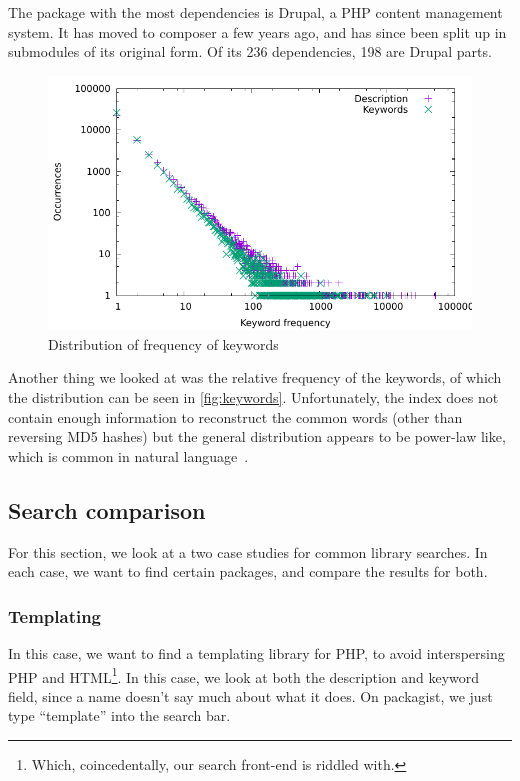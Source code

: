 \documentclass{article}
\begin{document}
The package with the most dependencies is Drupal, a PHP content management system. It has moved to composer a few years ago, and has since been split up in submodules of its original form. Of its 236 dependencies, 198 are Drupal parts.

\begin{figure}
	\centering
	\includegraphics[width=\textwidth]{keywords}
	\caption{Distribution of frequency of keywords}
	\label{fig:keywords}
\end{figure}

Another thing we looked at was the relative frequency of the keywords, of which the distribution can be seen in \autoref{fig:keywords}. Unfortunately, the index does not contain enough information to reconstruct the common words (other than reversing MD5 hashes) but the general distribution appears to be power-law like, which is common in natural language~\cite{zipf}.

\subsection{Search comparison}

For this section, we look at a two case studies for common library searches. In each case, we want to find certain packages, and compare the results for both.

\subsubsection{Templating}

In this case, we want to find a templating library for PHP, to avoid interspersing PHP and HTML\footnote{Which, coincedentally, our search front-end is riddled with.}. In this case, we look at both the description and keyword field, since a name doesn't say much about what it does. On packagist, we just type ``template'' into the search bar.
\end{document}
